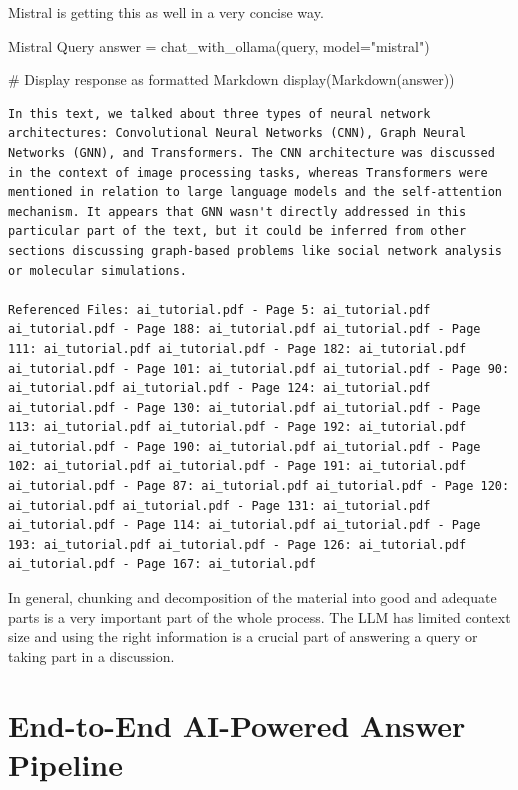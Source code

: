 Mistral is getting this as well in a very concise way. 

\begin{codeonly}{Mistral Query}
answer = chat_with_ollama(query, model="mistral")

# Display response as formatted Markdown
display(Markdown(answer))
\end{codeonly}

\lstset{language=}
\begin{lstlisting}
In this text, we talked about three types of neural network architectures: Convolutional Neural Networks (CNN), Graph Neural Networks (GNN), and Transformers. The CNN architecture was discussed in the context of image processing tasks, whereas Transformers were mentioned in relation to large language models and the self-attention mechanism. It appears that GNN wasn't directly addressed in this particular part of the text, but it could be inferred from other sections discussing graph-based problems like social network analysis or molecular simulations.

Referenced Files: ai_tutorial.pdf - Page 5: ai_tutorial.pdf ai_tutorial.pdf - Page 188: ai_tutorial.pdf ai_tutorial.pdf - Page 111: ai_tutorial.pdf ai_tutorial.pdf - Page 182: ai_tutorial.pdf ai_tutorial.pdf - Page 101: ai_tutorial.pdf ai_tutorial.pdf - Page 90: ai_tutorial.pdf ai_tutorial.pdf - Page 124: ai_tutorial.pdf ai_tutorial.pdf - Page 130: ai_tutorial.pdf ai_tutorial.pdf - Page 113: ai_tutorial.pdf ai_tutorial.pdf - Page 192: ai_tutorial.pdf ai_tutorial.pdf - Page 190: ai_tutorial.pdf ai_tutorial.pdf - Page 102: ai_tutorial.pdf ai_tutorial.pdf - Page 191: ai_tutorial.pdf ai_tutorial.pdf - Page 87: ai_tutorial.pdf ai_tutorial.pdf - Page 120: ai_tutorial.pdf ai_tutorial.pdf - Page 131: ai_tutorial.pdf ai_tutorial.pdf - Page 114: ai_tutorial.pdf ai_tutorial.pdf - Page 193: ai_tutorial.pdf ai_tutorial.pdf - Page 126: ai_tutorial.pdf ai_tutorial.pdf - Page 167: ai_tutorial.pdf
\end{lstlisting}

In general, chunking and decomposition of the material into good and adequate parts is a very important part of the whole process. The LLM has limited context size and using the right information is a crucial part of answering a query or taking part in a discussion. 

%
\section{End-to-End AI-Powered Answer Pipeline}

